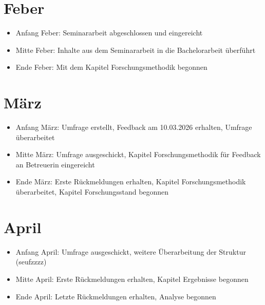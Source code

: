 \section{Feber}
\begin{itemize}
    \item Anfang Feber: Seminararbeit abgeschlossen und eingereicht
    \item Mitte Feber: Inhalte aus dem Seminararbeit in die Bachelorarbeit überführt
    \item Ende Feber: Mit dem Kapitel Forschungsmethodik begonnen
\end{itemize}

\section{März}
\begin{itemize}
    \item Anfang März: Umfrage erstellt, Feedback am 10.03.2026 erhalten, Umfrage überarbeitet 
    \item Mitte März: Umfrage ausgeschickt, Kapitel Forschungsmethodik für Feedback an Betreuerin eingereicht 
    \item Ende März: Erste Rückmeldungen erhalten, Kapitel Forschungsmethodik überarbeitet, Kapitel Forschungsstand begonnen
\end{itemize}

\section{April}
\begin{itemize}
    \item Anfang April: Umfrage ausgeschickt, weitere Überarbeitung der Struktur (seufzzzz)
    \item Mitte April:  Erste Rückmeldungen erhalten, Kapitel Ergebnisse begonnen
    \item Ende April: Letzte Rückmeldungen erhalten, Analyse begonnen

\end{itemize}

